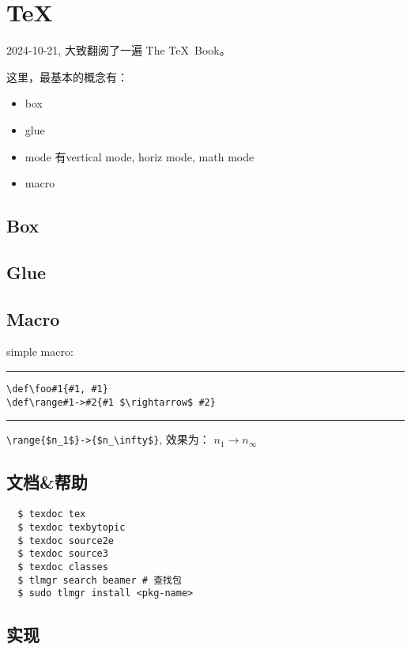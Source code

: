 \chapter{\TeX}

2024-10-21, 大致翻阅了一遍 The \TeX\ Book。

这里，最基本的概念有：
\begin{itemize}
\item{box}
\item{glue}
\item{mode} 有vertical mode, horiz mode, math mode
\item{macro}
\end{itemize}

\section{Box}

\section{Glue}

\section{Macro}

simple macro:
\vskip3pt\hrule
\begin{verbatim}
\def\foo#1{#1, #1}
\def\range#1->#2{#1 $\rightarrow$ #2}
\end{verbatim}
\hrule\vskip3pt

\def\range#1->#2{#1$\rightarrow$#2}
\verb|\range{$n_1$}->{$n_\infty$}|, 效果为：
\range{$n_1$}->{$n_\infty$}

\section{文档\&帮助}

\begin{verbatim}
  $ texdoc tex
  $ texdoc texbytopic
  $ texdoc source2e
  $ texdoc source3
  $ texdoc classes
  $ tlmgr search beamer # 查找包
  $ sudo tlmgr install <pkg-name>
\end{verbatim}

\section{实现}


